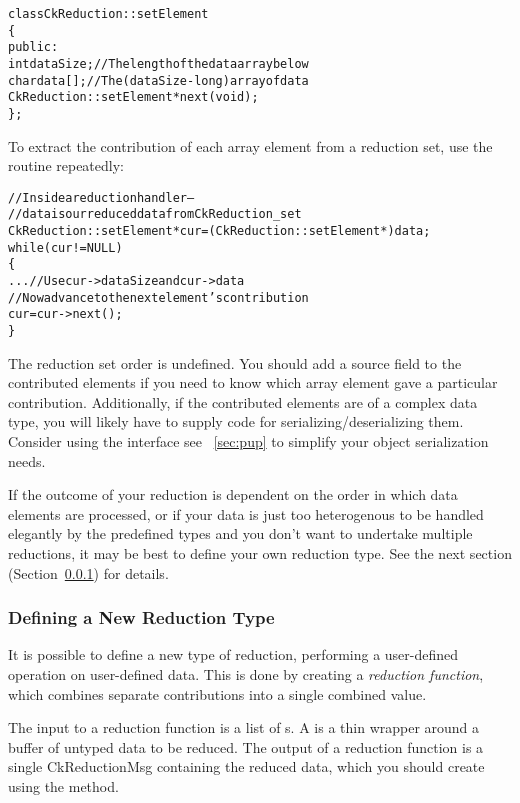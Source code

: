 \begin{alltt}
class CkReduction::setElement 
\{
public:
  int dataSize;//The length of the data array below
  char data[];//The (dataSize-long) array of data
  CkReduction::setElement *next(void);
\};
\end{alltt}

To extract the contribution of each array element from a reduction set, use the
 routine repeatedly:

\begin{alltt}
  //Inside a reduction handler-- 
  //  data is our reduced data from CkReduction_set
  CkReduction::setElement *cur=(CkReduction::setElement *)data;
  while (cur!=NULL)
  \{
    ... //Use cur->dataSize and cur->data
    //Now advance to the next element's contribution
    cur=cur->next();
  \}
\end{alltt}

The reduction set order is undefined.  You should add a source field to the
contributed elements if you need to know which array element gave a particular
contribution.  Additionally, if the contributed elements are of a complex 
data type, you will likely have to supply code for 
serializing/deserializing them.
Consider using the 
interface see ~\ref{sec:pup} to simplify your object serialization
needs.

If the outcome of your reduction is dependent on the order in which 
data elements are processed, or if your data is just too
heterogenous to be handled elegantly by the predefined types and you
don't want to undertake multiple reductions, it may be best to define
your own reduction type.  See the next section
(Section~\ref{new_type_reduction}) for details.


\subsubsection{Defining a New Reduction Type}

\label{new_type_reduction}

It is possible to define a new type of reduction, performing a 
user-defined operation on user-defined data.  This is done by 
creating a {\em reduction function}, which 
combines separate contributions 
into a single combined value.

The input to a reduction function is a list of s.
A  is a thin wrapper around a buffer of untyped data
to be reduced.  
The output of a reduction function is a single CkReductionMsg
containing the reduced data, which you should create using the
 method.  

